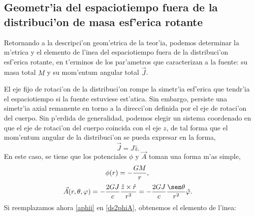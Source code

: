 \subsection{Geometr'ia del espaciotiempo fuera de la distribuci'on de masa esf'erica rotante}

Retornando a la descripci'on geom'etrica de la teor'ia, podemos determinar la m'etrica  y el elemento de l'inea del espaciotiempo fuera de la distribuci'on esf'erica rotante, en t'erminos de los par'ametros que caracterizan a la fuente: su masa total $M$ y su mom'entum angular total $\vec{J}$.

El eje fijo de rotaci'on de la distribuci'on rompe la simetr'ia esf'erica que tendr'ia el espaciotiempo si la fuente estuviese est'atica. Sin embargo, persiste una simetr'ia axial remanente  en torno a la direcci'on definida por el eje de rotaci'on del cuerpo. Sin p'erdida de generalidad, podemos elegir un sistema coordenado en que el eje de rotaci'on del cuerpo coincida con el eje $z$, de tal forma que el mom'entum angular de la distribuci'on se pueda expresar en la forma,
\begin{equation}
\vec{J}=J\hat{z}.
\end{equation}
En este caso, se tiene que los potenciales $\phi$ y $\vec{A}$ toman una forma m'as simple,
\begin{equation}
\phi(r) = -\frac{GM}{r},\label{phiii}\\
\end{equation}
\begin{equation}
\vec{A}(r,\theta,\varphi ) = -\frac{2GJ}{c}\frac{\hat{z}\times\hat{r}}{r^2}
=-\frac{2GJ}{c}\frac{\sen \theta }{r^2}\hat{\varphi}%
.\label{aphii}
\end{equation}
Si reemplazamos ahora \eqref{aphii} en \eqref{ds2phiA}, obtenemos el elemento de l'inea:
